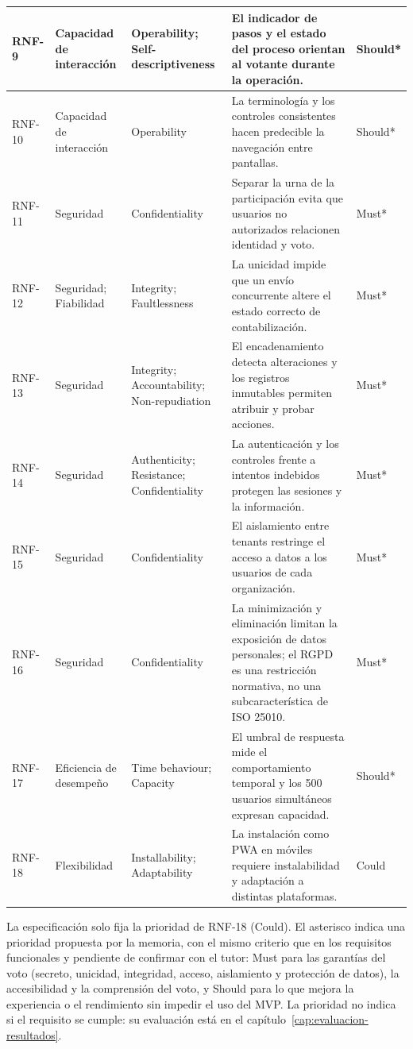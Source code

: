 \begin{longtable}{|p{}|p{}|p{}|p{}|p{}|}
\hline
RNF-9 & Capacidad de interacción & Operability; Self-descriptiveness & El indicador de pasos y el estado del proceso orientan al votante durante la operación. & Should* \\
\hline
RNF-10 & Capacidad de interacción & Operability & La terminología y los controles consistentes hacen predecible la navegación entre pantallas. & Should* \\
\hline
RNF-11 & Seguridad & Confidentiality & Separar la urna de la participación evita que usuarios no autorizados relacionen identidad y voto. & Must* \\
\hline
RNF-12 & Seguridad; Fiabilidad & Integrity; Faultlessness & La unicidad impide que un envío concurrente altere el estado correcto de contabilización. & Must* \\
\hline
RNF-13 & Seguridad & Integrity; Accountability; Non-repudiation & El encadenamiento detecta alteraciones y los registros inmutables permiten atribuir y probar acciones. & Must* \\
\hline
RNF-14 & Seguridad & Authenticity; Resistance; Confidentiality & La autenticación y los controles frente a intentos indebidos protegen las sesiones y la información. & Must* \\
\hline
RNF-15 & Seguridad & Confidentiality & El aislamiento entre tenants restringe el acceso a datos a los usuarios de cada organización. & Must* \\
\hline
RNF-16 & Seguridad & Confidentiality & La minimización y eliminación limitan la exposición de datos personales; el RGPD es una restricción normativa, no una subcaracterística de ISO 25010. & Must* \\
\hline
RNF-17 & Eficiencia de desempeño & Time behaviour; Capacity & El umbral de respuesta mide el comportamiento temporal y los 500 usuarios simultáneos expresan capacidad. & Should* \\
\hline
RNF-18 & Flexibilidad & Installability; Adaptability & La instalación como PWA en móviles requiere instalabilidad y adaptación a distintas plataformas. & Could \\
\hline
\end{longtable}
\setlength{\tabcolsep}{6pt}
\normalsize

\noindent\footnotesize La especificación solo fija la prioridad de RNF-18
(Could). El asterisco indica una prioridad propuesta por la memoria, con el
mismo criterio que en los requisitos funcionales y pendiente de confirmar con
el tutor: Must para las garantías del voto (secreto, unicidad, integridad,
acceso, aislamiento y protección de datos), la accesibilidad y la comprensión
del voto, y Should para lo que mejora la experiencia o el rendimiento sin
impedir el uso del MVP. La prioridad no indica si el requisito se cumple: su
evaluación está en el capítulo~\ref{cap:evaluacion-resultados}.\normalsize

